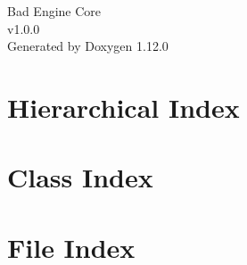 \documentclass[twoside]{book}
\newcommand{\+}{\discretionary{\mbox{\scriptsize$\hookleftarrow$}}{}{}}
\newcommand{\clearemptydoublepage}{%
    \newpage{\pagestyle{empty}\cleardoublepage}%
  }
\begin{document}
  \raggedbottom
    \hypersetup{pageanchor=false,
                bookmarksnumbered=true,
                pdfencoding=unicode
               }
  \begin{titlepage}
  \vspace*{7cm}
  \begin{center}%
  {\Large Bad Engine Core}\\
  [1ex]\large v1.\+0.\+0 \\
  \vspace*{1cm}
  {\large Generated by Doxygen 1.12.0}\\
  \end{center}
  \end{titlepage}
  \clearemptydoublepage
  \tableofcontents
  \clearemptydoublepage
  \hypersetup{pageanchor=true}
\chapter{Hierarchical Index}

\chapter{Class Index}

\chapter{File Index}

\end{document}
